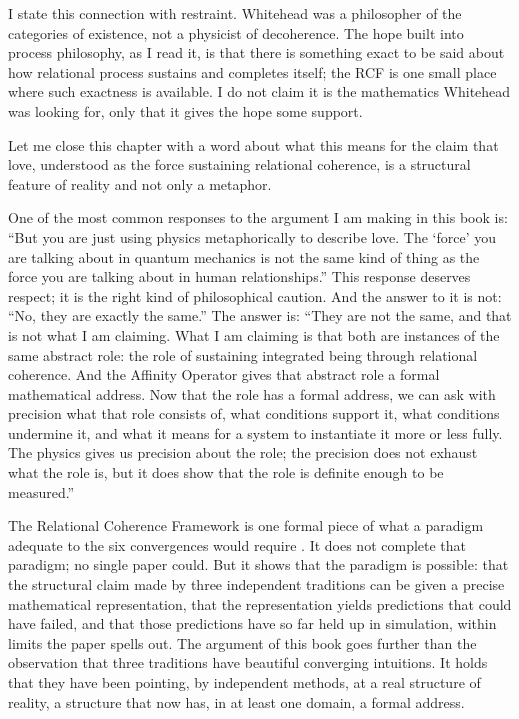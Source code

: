 I state this connection with restraint. Whitehead was a philosopher of the categories of existence, not a physicist of decoherence. The hope built into process philosophy, as I read it, is that there is something exact to be said about how relational process sustains and completes itself; the RCF is one small place where such exactness is available. I do not claim it is the mathematics Whitehead was looking for, only that it gives the hope some support.

Let me close this chapter with a word about what this means for the claim that love, understood as the force sustaining relational coherence, is a structural feature of reality and not only a metaphor.

One of the most common responses to the argument I am making in this book is: ``But you are just using physics metaphorically to describe love. The `force' you are talking about in quantum mechanics is not the same kind of thing as the force you are talking about in human relationships.'' This response deserves respect; it is the right kind of philosophical caution. And the answer to it is not: ``No, they are exactly the same.'' The answer is: ``They are not the same, and that is not what I am claiming. What I am claiming is that both are instances of the same abstract role: the role of sustaining integrated being through relational coherence. And the Affinity Operator gives that abstract role a formal mathematical address. Now that the role has a formal address, we can ask with precision what that role consists of, what conditions support it, what conditions undermine it, and what it means for a system to instantiate it more or less fully. The physics gives us precision about the role; the precision does not exhaust what the role is, but it does show that the role is definite enough to be measured.''

The Relational Coherence Framework is one formal piece of what a paradigm adequate to the six convergences would require \citep{AdamsMahabbat, AdamsThreePaths}. It does not complete that paradigm; no single paper could. But it shows that the paradigm is possible: that the structural claim made by three independent traditions can be given a precise mathematical representation, that the representation yields predictions that could have failed, and that those predictions have so far held up in simulation, within limits the paper spells out. The argument of this book goes further than the observation that three traditions have beautiful converging intuitions. It holds that they have been pointing, by independent methods, at a real structure of reality, a structure that now has, in at least one domain, a formal address.

